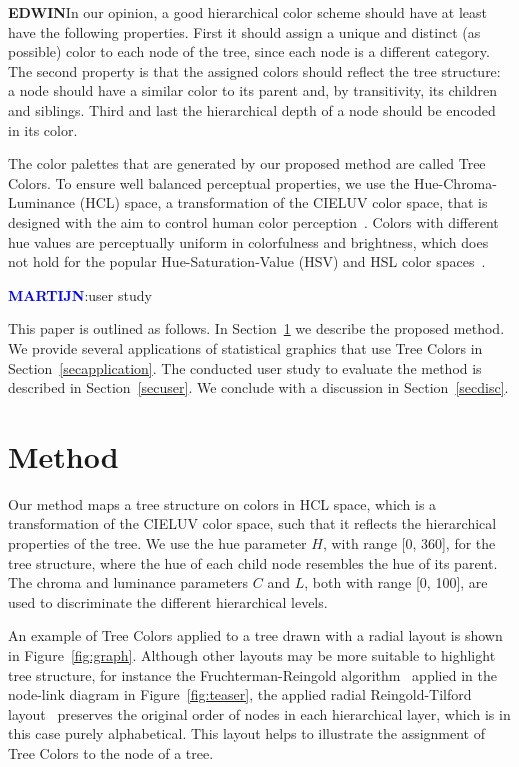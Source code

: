 \documentclass[review,journal]{vgtc}         %
\newcommand{\E}{\textcolor{cornellred}{\textbf{EDWIN}}}
\newcommand{\M}{\textcolor{blue}{\textbf{MARTIJN}}}
\begin{document}
\E In our opinion, a good hierarchical color scheme should have at least have the following properties. First it should assign a unique and distinct (as possible) color to each node of the tree, since each node is a different category. The second property is that the assigned colors should reflect the tree structure: a node should have a similar color to its parent and, by transitivity, its children and siblings.
Third and last the hierarchical depth of a node should be encoded in its color. 

The color palettes that are generated by our proposed method are called Tree Colors. To ensure well
balanced perceptual properties, we use the Hue-Chroma-Luminance (HCL) space, a transformation of the CIELUV color space, that is designed with the aim to control human color perception~\cite{ihaka2003}. Colors with different hue values are perceptually uniform in colorfulness and brightness, which does not hold for the popular Hue-Saturation-Value (HSV) and HSL color spaces~\cite{zeileis2009}.

 \M :user study

This paper is outlined as follows. In Section~\ref{secmethod} we describe the proposed method. We provide several applications of statistical graphics that use Tree Colors in Section~\ref{secapplication}. The conducted user study to evaluate the method is described in Section~\ref{secuser}. We conclude with a discussion in Section~\ref{secdisc}.

\section{Method}\label{secmethod}
Our method maps a tree structure on colors in HCL space, which is a transformation of the CIELUV color space, such that it reflects the hierarchical properties of the tree. We use the hue parameter $H$, with range [0, 360], for the tree structure, where the hue of each child node resembles the hue of its parent. The chroma and luminance parameters $C$ and $L$, both with range [0, 100], are used to discriminate the different hierarchical levels.

An example of Tree Colors applied to a tree drawn with a radial layout is shown in Figure~\ref{fig:graph}. 
Although other layouts may be more suitable to highlight tree structure, for instance the Fruchterman-Reingold algorithm~\cite{Fruchterman91} applied in the node-link diagram in Figure~\ref{fig:teaser}, the applied radial Reingold-Tilford layout~\cite{reingold81} preserves the original order of nodes in each hierarchical layer, which is in this case purely alphabetical. This layout helps to illustrate the assignment of Tree Colors to the node of a tree. 
\end{document}

